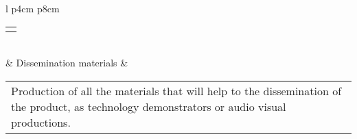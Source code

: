 \begin{longtable}[H]{l p{4cm} p{8cm}}
\begin{tabular}[c]{@{}l@{}}
\begin{minipage}[t]{\linewidth}
	\end{minipage} \end{tabular}
	\\  & Dissemination materials & 
	\begin{tabular}[c]{@{}l@{}}\begin{minipage}[t]{\linewidth}
			Production of all the materials that will help to the dissemination of the product, as technology demonstrators or audio visual productions.
	\end{minipage} \end{tabular}
	\\ \bottomrule[2pt]
\end{longtable}